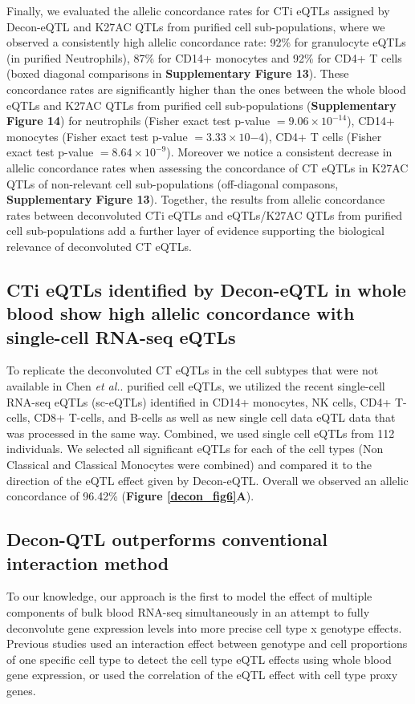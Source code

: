 Finally, we evaluated the allelic concordance rates for CTi eQTLs assigned by Decon-eQTL and K27AC QTLs from purified cell sub-populations, where we observed a consistently high allelic concordance rate: 92\% for granulocyte eQTLs (in purified Neutrophils), 87\% for CD14+ monocytes and 92\% for CD4+ T cells (boxed diagonal comparisons in \textbf{Supplementary Figure 13}). These concordance rates are significantly higher than the ones between the whole blood eQTLs and K27AC QTLs from purified cell sub-populations (\textbf{Supplementary Figure 14}) for neutrophils (Fisher exact test p-value $= 9.06 \times 10^{-14}$), CD14+ monocytes (Fisher exact test p-value $= 3.33 \times 10{-4}$), CD4+ T cells (Fisher exact test p-value $= 8.64 \times 10^{-9}$). Moreover we notice a consistent decrease in allelic concordance rates when assessing the concordance of CT eQTLs in K27AC QTLs of non-relevant cell sub-populations (off-diagonal compasons, \textbf{Supplementary Figure 13}). Together, the results from allelic concordance rates between deconvoluted CTi eQTLs and eQTLs/K27AC QTLs from purified cell sub-populations add a further layer of evidence supporting the biological relevance of deconvoluted CT eQTLs.

\subsection{CTi eQTLs identified by Decon-eQTL in whole blood show high allelic concordance with single-cell RNA-seq eQTLs}
To replicate the deconvoluted CT eQTLs in the cell subtypes that were not available in Chen \textit{et al.}\cite{chenGeneticDriversEpigenetic2016}. purified cell eQTLs, we utilized the recent single-cell RNA-seq eQTLs (sc-eQTLs) identified in CD14+ monocytes, NK cells, CD4+ T-cells, CD8+ T-cells, and B-cells\cite{wijstSinglecellRNASequencing2018} as well as new single cell data eQTL data that was processed in the same way. Combined, we used single cell eQTLs from 112 individuals. We selected all significant eQTLs for each of the cell types (Non Classical and Classical Monocytes were combined) and compared it to the direction of the eQTL effect given by Decon-eQTL. Overall we observed an allelic concordance of 96.42\% (\textbf{Figure \ref{decon_fig6}A}).

\subsection{Decon-QTL outperforms conventional interaction method}
To our knowledge, our approach is the first to model the effect of multiple components of bulk blood RNA-seq simultaneously in an attempt to fully deconvolute gene expression levels into more precise cell type x genotype effects. Previous studies used an interaction effect between genotype and cell proportions of one specific cell type to detect the cell type eQTL effects using whole blood gene expression\cite{westraCellSpecificEQTL2015}, or used the correlation of the eQTL effect with cell type proxy genes\cite{zhernakovaIdentificationContextdependentExpression2017}. 

